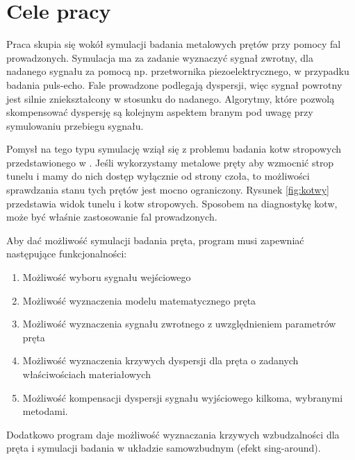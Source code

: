 \section{Cele pracy}
\label{sec:cel}

Praca skupia się wokół symulacji badania metalowych prętów przy pomocy fal prowadzonych. Symulacja ma za zadanie wyznaczyć sygnał zwrotny, dla nadanego sygnału za pomocą np. przetwornika piezoelektrycznego, w przypadku badania puls-echo. Fale prowadzone podlegają dyspersji, więc sygnał powrotny jest silnie zniekształcony w stosunku do nadanego. Algorytmy, które pozwolą skompensować dyspersję są kolejnym aspektem branym pod uwagę przy symulowaniu przebiegu sygnału.

Pomysł na tego typu symulację wziął się z problemu badania kotw stropowych przedstawionego w \cite{kotwy}. Jeśli wykorzystamy metalowe pręty aby wzmocnić strop tunelu i mamy do nich dostęp wyłącznie od strony czoła, to możliwości sprawdzania stanu tych prętów jest mocno ograniczony. Rysunek \ref{fig:kotwy} przedstawia widok tunelu i kotw stropowych. Sposobem na diagnostykę kotw, może być właśnie zastosowanie fal prowadzonych. 

Aby dać możliwość symulacji badania pręta, program musi zapewniać następujące funkcjonalności:
\begin{enumerate}
  \item Możliwość wyboru sygnału wejściowego
  \item Możliwość wyznaczenia modelu matematycznego pręta
  \item Możliwość wyznaczenia sygnału zwrotnego z uwzględnieniem parametrów pręta
  \item Możliwość wyznaczenia krzywych dyspersji dla pręta o zadanych właściwościach materiałowych
  \item Możliwość kompensacji dyspersji sygnału wyjściowego kilkoma, wybranymi metodami.
\end{enumerate}

\vspace{5mm}

Dodatkowo program daje możliwość wyznaczania krzywych wzbudzalności dla pręta i symulacji badania w układzie samowzbudnym (efekt sing-around).



















